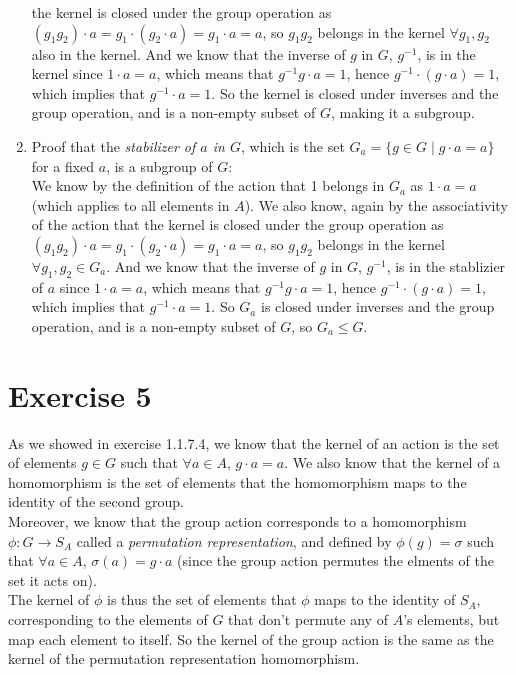\documentclass{article}
\begin{document}
\begin{enumerate}[label=\textbf{\alph*.}]
            the kernel is closed under the group operation
            as $(g_1g_2) \cdot a = g_1 \cdot (g_2 \cdot a) = g_1 \cdot a = a$, 
            so $g_1g_2$ belongs in the kernel
            $\forall g_1, g_2$ also in the kernel.
            And we know that the inverse of $g$ in $G$, $g^{-1}$,
            is in the kernel since $1 \cdot a = a$,
            which means that $g^{-1}g \cdot a = 1$,
            hence $g^{-1} \cdot (g \cdot a) = 1$,
            which implies that $g^{-1} \cdot a = 1$.
            So the kernel is closed under inverses and the group operation,
            and is a non-empty subset of $G$,
            making it a subgroup.
        \item
            Proof that the \textit{stabilizer of $a$ in $G$},
            which is the set $G_a = \{ g \in G \mid g \cdot a = a \}$
            for a fixed $a$,
            is a subgroup of $G$: \\
            We know by the definition of the action that 1 belongs
            in $G_a$ as $1 \cdot a = a$ (which applies to all elements in $A$).
            We also know, again by the associativity of the action that
            the kernel is closed under the group operation
            as $(g_1g_2) \cdot a = g_1 \cdot (g_2 \cdot a) = g_1 \cdot a = a$, 
            so $g_1g_2$ belongs in the kernel $\forall g_1, g_2 \in G_a$.
            And we know that the inverse of $g$ in $G$, $g^{-1}$,
            is in the stablizier of $a$ since $1 \cdot a = a$,
            which means that $g^{-1}g \cdot a = 1$,
            hence $g^{-1} \cdot (g \cdot a) = 1$,
            which implies that $g^{-1} \cdot a = 1$.
            So $G_a$ is closed under inverses and the group operation,
            and is a non-empty subset of $G$,
            so $G_a \leqslant G$.
    \end{enumerate}


    \section*{Exercise 5}
    As we showed in exercise 1.1.7.4,
    we know that the kernel of an action is the set of elements $g \in G$
    such that $\forall a \in A$, $g \cdot a = a$.
    We also know that the kernel of a homomorphism is the set of elements
    that the homomorphism maps to the identity of the second group. \\ 
    Moreover, we know that the group action corresponds to a
    homomorphism $\phi: G \to S_A$
    called a \textit{permutation representation},
    and defined by $\phi(g) = \sigma$
    such that $\forall a \in A$, $\sigma(a) = g \cdot a$
    (since the group action permutes the elments of the set it acts on). \\
    The kernel of $\phi$ is thus the set of elements that
    $\phi$ maps to the identity of $S_A$, corresponding
    to the elements of $G$ that don't permute any of $A$'s elements,
    but map each element to itself.
    So the kernel of the group action is the same as the kernel of
    the permutation representation homomorphism. \\
\end{document}
